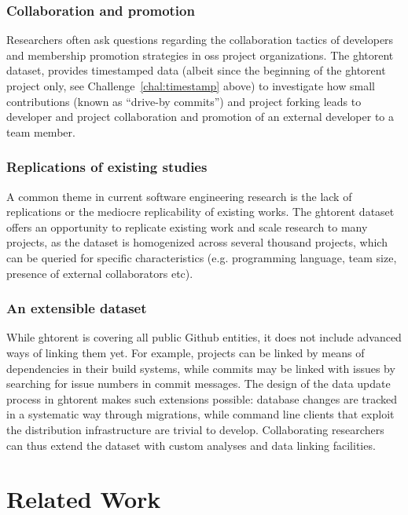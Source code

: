 \documentclass[conference,letter]{IEEEtran}
\begin{document}
\subsubsection{Collaboration and promotion} Researchers often ask questions
regarding the collaboration tactics of developers and membership promotion
strategies in {\sc oss} project organizations.  The {\sc ght}orent dataset,
provides timestamped data (albeit since the beginning of the {\sc ght}orent
project only, see Challenge~\ref{chal:timestamp} above) to investigate
how small contributions (known as ``drive-by commits'') and project
forking leads to developer and project collaboration and promotion of an
external developer to a team member.

\subsubsection{Replications of existing studies} A common theme in current
software engineering research is the lack of replications or the
mediocre replicability of existing works. The {\sc ght}orent dataset offers
an opportunity to replicate existing work and scale research to many
projects, as the dataset is homogenized across several thousand projects,
which can be queried for specific characteristics (e.g. programming language,
team size, presence of external collaborators etc).

\subsubsection{An extensible dataset} While {\sc ght}orent is covering all 
 public Github entities, it does not include advanced ways of
linking them yet. For example, projects can be linked by means of dependencies
in their build systems, while commits may be linked with issues by
searching for issue numbers in commit messages. The design of the
data update process in {\sc ght}orent makes such extensions possible:
database changes are tracked in a systematic way through migrations, while  
command line clients that exploit the distribution infrastructure are
trivial to develop. Collaborating researchers can thus extend the dataset
with custom analyses and data linking facilities.


\section{Related Work}
\end{document}
